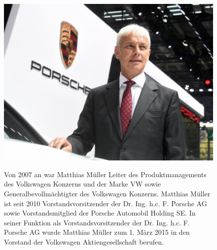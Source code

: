 \documentclass[12pt]{article}
\begin{document}
\begin{figure}[here!]
	\centering
	\begin{minipage}[h]{0.20\textwidth}
		\centering
		\includegraphics[width=1.0\textwidth]{images/MathiasMueller.jpg}
		\label{fig:vorstandvw4}
		\cite{mmpic}
	\end{minipage}
	\begin{minipage}[h]{0.10\textwidth}
		\hspace{1cm} 
	\end{minipage}
	\begin{minipage}[h]{0.65\textwidth}
		Von 2007 an war Matthias Müller Leiter des Produktmanagements des Volkswagen Konzerns und der Marke VW sowie Generalbevollmächtigter des Volkswagen Konzerns. Matthias Müller ist seit 2010 Vorstandsvorsitzender der Dr. Ing. h.c. F. Porsche AG sowie Vorstandsmitglied der Porsche Automobil Holding SE.
		In seiner Funktion als Vorstandsvorsitzender der Dr. Ing. h.c. F. Porsche AG wurde Matthias Müller zum 1. März 2015 in den Vorstand der Volkswagen Aktiengesellschaft berufen.
	\end{minipage}
\end{figure}
\end{document}
